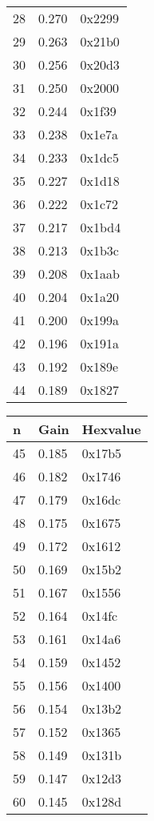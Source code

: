 \begin{table}[H]
\begin{subtable}[t]{0.30\linewidth}
\begin{tabular}{lll}
28 & 0.270 & 0x2299 \\ 
29 & 0.263 & 0x21b0 \\ 
30 & 0.256 & 0x20d3 \\ 
31 & 0.250 & 0x2000 \\ 
32 & 0.244 & 0x1f39 \\ 
33 & 0.238 & 0x1e7a \\ 
34 & 0.233 & 0x1dc5 \\ 
35 & 0.227 & 0x1d18 \\ 
36 & 0.222 & 0x1c72 \\ 
37 & 0.217 & 0x1bd4 \\ 
38 & 0.213 & 0x1b3c \\ 
39 & 0.208 & 0x1aab \\ 
40 & 0.204 & 0x1a20 \\ 
41 & 0.200 & 0x199a \\ 
42 & 0.196 & 0x191a \\ 
43 & 0.192 & 0x189e \\
44 & 0.189 & 0x1827 \\  
  \bottomrule
\end{tabular}
\end{subtable}\hfill
\vspace{0.7cm}
\begin{subtable}[t]{0.30\linewidth}
\centering
\vspace{0pt}
\begin{tabular}{lll}
  \toprule
n & Gain & Hexvalue \\
  \midrule
45 & 0.185 & 0x17b5 \\ 
46 & 0.182 & 0x1746 \\ 
47 & 0.179 & 0x16dc \\ 
48 & 0.175 & 0x1675 \\ 
49 & 0.172 & 0x1612 \\ 
50 & 0.169 & 0x15b2 \\ 
51 & 0.167 & 0x1556 \\ 
52 & 0.164 & 0x14fc \\ 
53 & 0.161 & 0x14a6 \\ 
54 & 0.159 & 0x1452 \\ 
55 & 0.156 & 0x1400 \\ 
56 & 0.154 & 0x13b2 \\ 
57 & 0.152 & 0x1365 \\ 
58 & 0.149 & 0x131b \\ 
59 & 0.147 & 0x12d3 \\ 
60 & 0.145 & 0x128d \\ 

\end{tabular}
\end{subtable}
\end{table}
